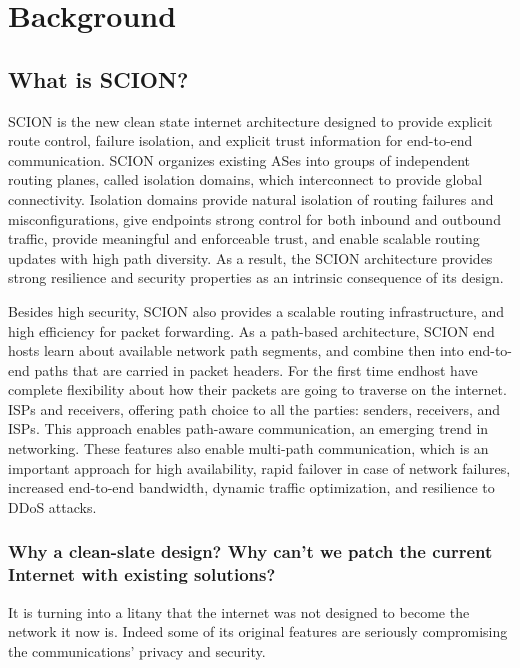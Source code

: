 
\chapter{Background} %

\label{background} %

\section{What is SCION?}
SCION is the new clean state internet architecture designed to provide explicit route control, failure isolation, and explicit trust information for end-to-end communication. SCION organizes existing ASes into groups of independent routing planes, called isolation domains, which interconnect to provide global connectivity. Isolation domains provide natural isolation of routing failures and misconfigurations, give endpoints strong control for both inbound and outbound traffic, provide meaningful and enforceable trust, and enable scalable routing updates with high path diversity. As a result, the SCION architecture provides strong resilience and security properties as an intrinsic consequence of its design.

Besides high security, SCION also provides a scalable routing infrastructure, and high efficiency for packet forwarding. As a path-based architecture, SCION end hosts learn about available network path segments, and combine then into end-to-end paths that are carried in packet headers. For the first time endhost have complete flexibility about how their packets are going to traverse on the internet. ISPs and receivers, offering path choice to all the parties: senders, receivers, and ISPs. This approach enables path-aware communication, an emerging trend in networking. These features also enable multi-path communication, which is an important approach for high availability, rapid failover in case of network failures, increased end-to-end bandwidth, dynamic traffic optimization, and resilience to DDoS attacks.

\subsection{Why a clean-slate design? Why can't we patch the current Internet with existing solutions?}
It is turning into a litany that the internet was not designed to become the network it now is. Indeed some of its original features are seriously compromising the communications’ privacy and security. 

